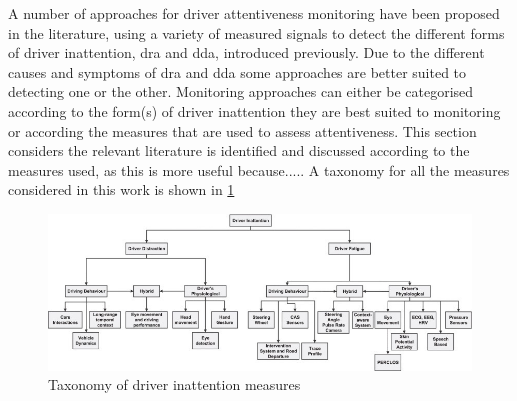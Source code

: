 \documentclass[11pt, parskip=half*,twoside=false]{scrbook}
\begin{document}
%
A number of approaches for driver attentiveness monitoring have been proposed in the literature, using a variety of measured signals to detect the different forms of driver inattention, \gls{dra} and \gls{dda}, introduced previously. Due to the different causes and symptoms of \gls{dra} and \gls{dda} some approaches are better suited to detecting one or the other. Monitoring approaches can either be categorised according to the form(s) of driver inattention they are best suited to monitoring or according the measures that are used to assess attentiveness. This section considers the relevant literature 
is identified and discussed according to the measures used, as this is more useful because..... A taxonomy for all the measures considered in this work is shown in \cref{fig:taxonomy_measures}

\begin{figure} 
	\centering
	\includegraphics[width=\textwidth]{inattention_inputs_taxonomy} 
	\caption{Taxonomy of driver inattention measures \citep{koesdwiadyRecentTrendsDriver2017}}
	\label{fig:taxonomy_measures}
\end{figure}
\end{document}
